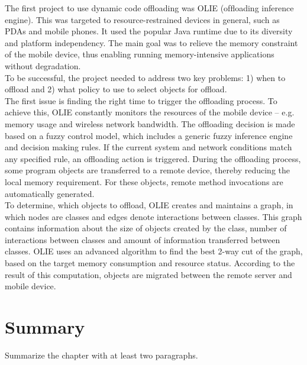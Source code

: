 The first project to use dynamic code offloading was OLIE (ofﬂoading inference engine). This was targeted to resource-restrained devices in general, such as PDAs and mobile phones. It used the popular Java runtime due to its diversity and platform independency. The main goal was to relieve the memory constraint of the mobile device, thus enabling running memory-intensive applications without degradation.\\[12pt]
To be successful, the project needed to address two key problems: 1) when to offload and 2) what policy to use to select objects for offload.\\[12pt]
The first issue is finding the right time to trigger the offloading process. To achieve this, OLIE constantly monitors the resources of the mobile device – e.g. memory usage and wireless network bandwidth. The offloading decision is made based on a fuzzy control model, which includes a generic fuzzy inference engine and decision making rules. If the current system and network conditions match any specified rule, an offloading action is triggered. During the offloading process, some program objects are transferred to a remote device, thereby reducing the local memory requirement. For these objects, remote method invocations are automatically generated.\\[12pt]
To determine, which objects to offload, OLIE creates and maintains a graph, in which nodes are classes and edges denote interactions between classes. This graph contains information about the size of objects created by the class, number of interactions between classes and amount of information transferred between classes. OLIE uses an advanced algorithm to find the best 2-way cut of the graph, based on the target memory consumption and resource status. According to the result of this computation, objects are migrated between the remote server and mobile device.


\section{Summary}
Summarize the chapter with at least two paragraphs.





